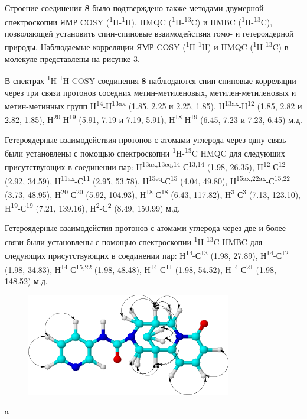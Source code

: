 Строение соединения {\bfseries 8} было подтверждено также методами
двумерной спектроскопии ЯМР COSY
(\textsuperscript{1}H-\textsuperscript{1}H), HMQC
(\textsuperscript{1}H-\textsuperscript{13}C) и HMВC
(\textsuperscript{1}H-\textsuperscript{13}C), позволяющей установить
спин-спиновые взаимодействия гомо- и гетероядерной природы. Наблюдаемые
корреляции ЯМР COSY (\textsuperscript{1}H-\textsuperscript{1}H) и HMQC
(\textsuperscript{1}H-\textsuperscript{13}C) в молекуле представлены на
рисунке 3.

В спектрах \textsuperscript{1}H-\textsuperscript{1}H COSY соединения
{\bfseries 8} наблюдаются спин-спиновые корреляции через три связи протонов
соседних метин-метиленовых, метилен-метиленовых и метин-метинных групп
Н\textsuperscript{14}-Н\textsuperscript{13ax} (1.85, 2.25 и 2.25, 1.85),
Н\textsuperscript{13ax}-Н\textsuperscript{12} (1.85, 2.82 и 2.82, 1.85),
Н\textsuperscript{20}-Н\textsuperscript{19} (5.91, 7.19 и 7.19, 5.91),
Н\textsuperscript{18}-Н\textsuperscript{19} (6.45, 7.23 и 7.23, 6.45)
м.д.

Гетероядерные взаимодействия протонов с атомами углерода через одну
связь были установлены с помощью спектроскопии
\textsuperscript{1}H-\textsuperscript{13}C HMQC для следующих
присутствующих в соединении пар:
Н\textsuperscript{13ax,13eq,14}-С\textsuperscript{13,14} (1.98, 26.35),
H\textsuperscript{12}-С\textsuperscript{12} (2.92, 34.59),
Н\textsuperscript{11ax}-С\textsuperscript{11} (2.95, 53.78),
Н\textsuperscript{15eq}-С\textsuperscript{15} (4.04, 49.80),
Н\textsuperscript{15ax,22ax}-С\textsuperscript{15,22} (3.73, 48.95),
H\textsuperscript{20}-С\textsuperscript{20} (5.92, 104.93),
Н\textsuperscript{18}-С\textsuperscript{18} (6.43, 117.82),
H\textsuperscript{3}-С\textsuperscript{3} (7.13, 123.10),
H\textsuperscript{19}-С\textsuperscript{19} (7.21, 139.16),
H\textsuperscript{2}-С\textsuperscript{2} (8.49, 150.99) м.д.

Гетероядерные взаимодейстия протонов с атомами углерода через две и
более связи были установлены с помощью спектроскопии
\textsuperscript{1}H-\textsuperscript{13}C HMВC для следующих
присутствующих в соединении пар:
Н\textsuperscript{14}-С\textsuperscript{13} (1.98, 27.89),
Н\textsuperscript{14}-С\textsuperscript{12} (1.98, 34.83),
Н\textsuperscript{14}-С\textsuperscript{15,22} (1.98, 48.48),
Н\textsuperscript{14}-С\textsuperscript{11} (1.98, 54.52),
Н\textsuperscript{14}-С\textsuperscript{21} (1.98, 148.52) м.д.

\begin{figure}[H]
	\centering
	\includegraphics[width=0.8\textwidth]{assets/11}
	\caption*{}
\end{figure}a

